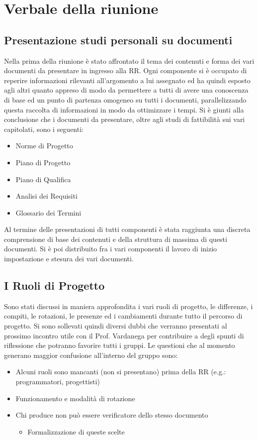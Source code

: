 \section{Verbale della riunione}
\subsection{Presentazione studi personali su documenti}
Nella prima della riunione è stato affrontato il tema dei contenuti e forma dei vari documenti da presentare in ingresso alla RR. Ogni componente si è occupato di reperire informazioni rilevanti all'argomento a lui assegnato ed ha quindi esposto agli altri quanto appreso di modo da permettere a tutti di avere una conoscenza di base ed un punto di partenza omogeneo su tutti i documenti, parallelizzando questa raccolta di informazioni in modo da ottimizzare i tempi.
Si è giunti alla conclusione che i documenti da presentare, oltre agli studi di fattibilità sui vari capitolati, sono i seguenti:
\begin{itemize}
    \item Norme di Progetto
    \item Piano di Progetto
    \item Piano di Qualifica
    \item Analisi dei Requisiti
    \item Glossario dei Termini
\end{itemize}
Al termine delle presentazioni di tutti componenti è stata raggiunta una discreta comprensione di base dei contenuti e della struttura di massima di questi documenti.
Si è poi distribuito fra i vari componenti il lavoro di inizio impostazione e stesura dei vari documenti.

\subsection{I Ruoli di Progetto}
Sono stati discussi in maniera approfondita i vari ruoli di progetto, le differenze, i compiti, le rotazioni, le presenze ed i cambiamenti durante tutto il percorso di progetto. Si sono sollevati quindi diversi dubbi che verranno presentati al prossimo incontro utile con il Prof. Vardanega per contribuire a degli spunti di riflessione che potranno favorire tutti i gruppi. Le questioni che al momento generano maggior confusione all'interno del gruppo sono:
\begin{itemize}
    \item Alcuni ruoli sono mancanti (non si presentano) prima della RR (e.g.: programmatori, progettisti)
    \item Funzionamento e modalità di rotazione
    \item Chi produce non può essere verificatore dello stesso documento
    \begin{itemize}
        \item Formalizzazione di queste scelte
    \end{itemize}
\end{itemize}

